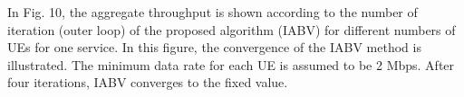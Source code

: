 \documentclass[lettersize,journal]{IEEEtran}
\begin{document}

In Fig. 10, the aggregate throughput is shown according to the number of iteration (outer loop) of the
proposed algorithm (IABV) for different numbers of UEs for one service. In this figure, the convergence of the IABV method is illustrated. The minimum data rate for each UE is assumed to be 2 Mbps.
After four iterations, IABV converges to the fixed value.
\end{document}
